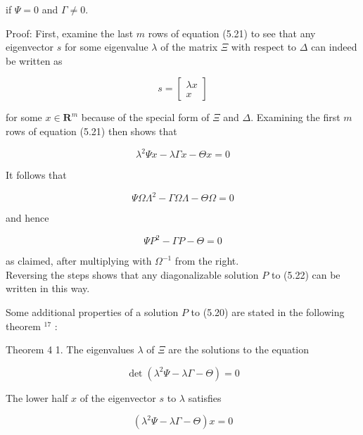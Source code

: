 \documentclass[10pt]{article}
\begin{document}
if $\Psi=0$ and $\Gamma \neq 0$.

Proof: First, examine the last $m$ rows of equation (5.21) to see that any eigenvector $s$ for some eigenvalue $\lambda$ of the matrix $\Xi$ with respect to $\Delta$ can indeed be written as

\begin{equation*}
s=\left[\begin{array}{l}
\lambda x \\
x
\end{array}\right]
\end{equation*}

for some $x \in \mathbf{R}^{m}$ because of the special form of $\Xi$ and $\Delta$. Examining the first $m$ rows of equation (5.21) then shows that

\begin{equation*}
\lambda^{2} \Psi x-\lambda \Gamma x-\Theta x=0 \tag{5.23}
\end{equation*}

It follows that

\begin{equation*}
\Psi \Omega \Lambda^{2}-\Gamma \Omega \Lambda-\Theta \Omega=0
\end{equation*}

and hence

\begin{equation*}
\Psi P^{2}-\Gamma P-\Theta=0
\end{equation*}

as claimed, after multiplying with $\Omega^{-1}$ from the right.\\
Reversing the steps shows that any diagonalizable solution $P$ to (5.22) can be written in this way.

Some additional properties of a solution $P$ to (5.20) are stated in the following theorem ${ }^{17}$ :

Theorem 4 1. The eigenvalues $\lambda$ of $\Xi$ are the solutions to the equation

\begin{equation*}
\operatorname{det}\left(\lambda^{2} \Psi-\lambda \Gamma-\Theta\right)=0
\end{equation*}

The lower half $x$ of the eigenvector $s$ to $\lambda$ satisfies

\begin{equation*}
\left(\lambda^{2} \Psi-\lambda \Gamma-\Theta\right) x=0
\end{equation*}
\end{document}
